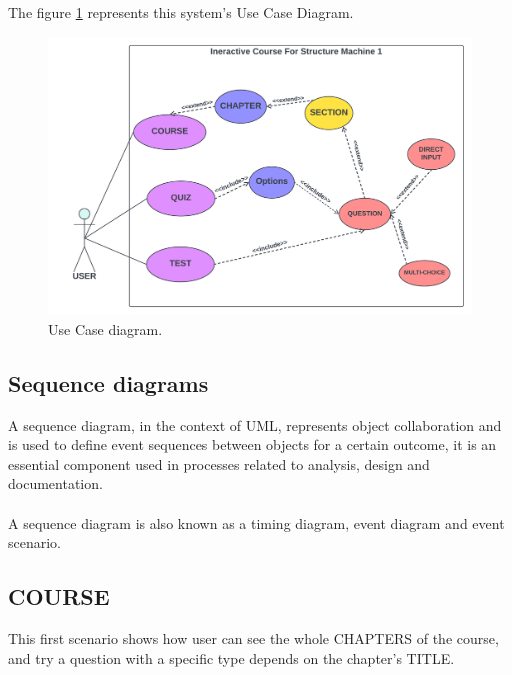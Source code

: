 The figure \ref{fig:UseCaseD} represents this system's Use Case Diagram.

\begin{figure}[ht]
	\centering
	\label{}\includegraphics[scale=0.5]{img/Use Case.pdf}                
	\caption{Use Case diagram.} 
	\label{fig:UseCaseD}
\end{figure} 

\subsection{Sequence diagrams}
A sequence diagram, in the context of UML, represents object collaboration and is used to define event sequences between objects for a certain outcome, it is an essential component used in processes related to analysis, design and documentation.\cite{Techopedia-DS} \\\\
A sequence diagram is also known as a timing diagram, event diagram and event scenario.\cite{Techopedia-DS}

\subsection{COURSE}
This first scenario shows how user can see the whole CHAPTERS of the course, and try  a question with a specific type depends on the chapter's TITLE.


